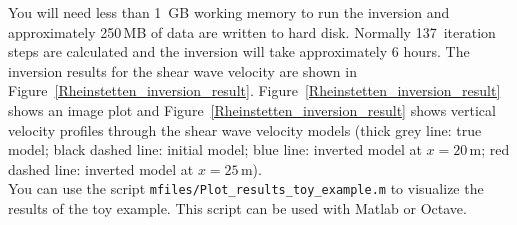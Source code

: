 You will need less than 1~GB working memory to run the inversion and approximately 250\,MB of data are written to hard disk. Normally 137~iteration steps are calculated and the inversion will take approximately 6 hours. The inversion results for the shear wave velocity are shown in Figure~\ref{Rheinstetten_inversion_result}. Figure~\ref{Rheinstetten_inversion_result} shows an image plot and Figure~\ref{Rheinstetten_inversion_result} shows vertical velocity profiles through the shear wave velocity models (thick grey line: true model; black dashed line: initial model; blue line: inverted model at $x=20$\,m; red dashed line: inverted model at $x=25$\,m).\\

You can use the script \texttt{mfiles/Plot\_results\_toy\_example.m} to visualize the results of the toy example. This script can be used with Matlab or Octave.

